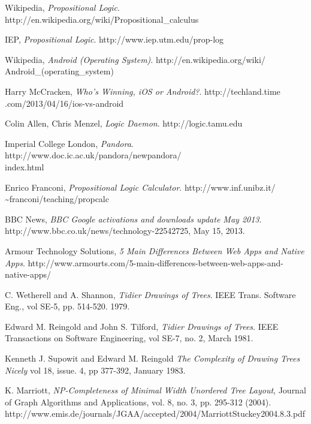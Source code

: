 \documentclass{report}
\begin{document}
\begin{thebibliography}{9}

  Wikipedia,
  \emph{Propositional Logic}.
  http://en.wikipedia.org/wiki/Propositional\_calculus

  IEP,
  \emph{Propositional Logic}.
  http://www.iep.utm.edu/prop-log

  Wikipedia,
  \emph{Android (Operating System)}.
  http://en.wikipedia.org/wiki/\\Android\_(operating\_system)

  Harry McCracken,
  \emph{Who’s Winning, iOS or Android?}.
  http://techland.time\\.com/2013/04/16/ios-vs-android

  Colin Allen, Chris Menzel,
  \emph{Logic Daemon}.
  http://logic.tamu.edu

  Imperial College London,
  \emph{Pandora}.
  http://www.doc.ic.ac.uk/pandora/newpandora/\\index.html

  Enrico Franconi,
  \emph{Propositional Logic Calculator}.
  http://www.inf.unibz.it/\\\textasciitilde franconi/teaching/propcalc

  BBC News,
  \emph{BBC Google activations and downloads update May 2013}. 
  http://www.bbc.co.uk/news/technology-22542725,
  May 15, 2013.

  Armour Technology Solutions,
  \emph{5 Main Differences Between Web Apps and Native Apps}.
  http://www.armourts.com/5-main-differences-between-web-apps-and-native-apps/

  C. Wetherell and A. Shannon,
  \emph{Tidier Drawings of Trees}.
  IEEE Trans. Software Eng., 
  vol SE-5, pp. 514-520.
  1979.

  Edward M. Reingold and John S. Tilford,
  \emph{Tidier Drawings of Trees}.
  IEEE Transactions on Software Engineering, 
  vol SE-7, no. 2,
  March 1981.

  Kenneth J. Supowit and Edward M. Reingold
  \emph{The Complexity of Drawing Trees Nicely}
  vol 18, issue. 4, pp 377-392,
  January 1983.

  K. Marriott, 
  \emph{NP-Completeness of Minimal Width Unordered Tree Layout}, 
  Journal of Graph Algorithms and Applications, 
  vol. 8, no. 3, pp. 295-312 (2004).
  http://www.emis.de/journals/JGAA/accepted/2004/MarriottStuckey2004.8.3.pdf


\end{thebibliography}
\end{document}
